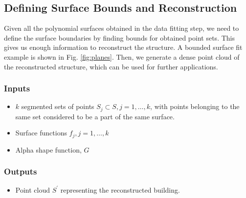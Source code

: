 \documentclass[12pt,a4paper]{article}
\begin{document}
    \subsection{Defining Surface Bounds and Reconstruction}
    
    Given all the polynomial surfaces obtained in the data fitting step, we need to define the surface boundaries by finding bounds for obtained point sets. This gives us enough information to reconstruct the structure. A bounded surface fit example is shown in Fig. \ref{fig:planes}. Then, we generate a dense point cloud of the reconstructed structure, which can be used for further applications.   
    
    
    
    \subsubsection{Inputs}
    \begin{itemize}
        \itemsep0em 
        \item $k$ segmented sets of points $S_j \subset S, j=1,\dots,k$, with points belonging to the same set considered to be a part of the same surface.
        \item Surface functions $f_j, j=1,\dots,k$
        \item Alpha shape function, $G$
    \end{itemize}
    
    
    \subsubsection{Outputs}
    \begin{itemize}
        \item Point cloud $S^\prime$ representing the reconstructed building.
    \end{itemize}
    
\end{document}
